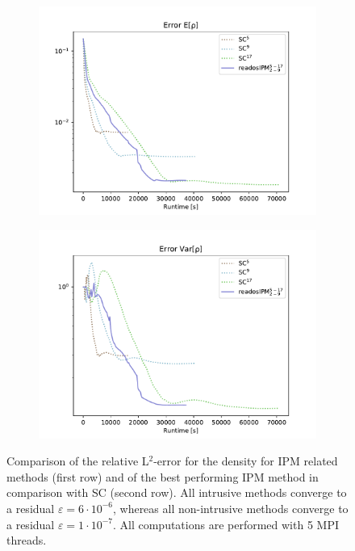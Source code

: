 \begin{figure}[h!]
	\begin{subfigure}{0.5\linewidth}
		\centering
				\includegraphics[width=\linewidth]{figs/errorEuler/L2_error_E[rho]_sc.pdf}
		\caption{}
		\label{fig:sub33}
	\end{subfigure}%
	\begin{subfigure}{0.5\linewidth}
		\centering
				\includegraphics[width=\linewidth]{figs/errorEuler/L2_error_Var[rho]_sc.pdf}
		\caption{}
		\label{fig:sub34}
	\end{subfigure}
	\caption{Comparison of the relative L$^2$-error for the density for IPM related methods (first row) and of the best performing IPM method in comparison with SC (second row). All intrusive methods converge to a residual $\varepsilon=6\cdot 10^{-6}$, whereas all non-intrusive methods converge to a residual $\varepsilon=1\cdot 10^{-7}$. All computations are performed with 5 MPI threads.}
	\label{fig:L2ErrorSolution}
\end{figure}
